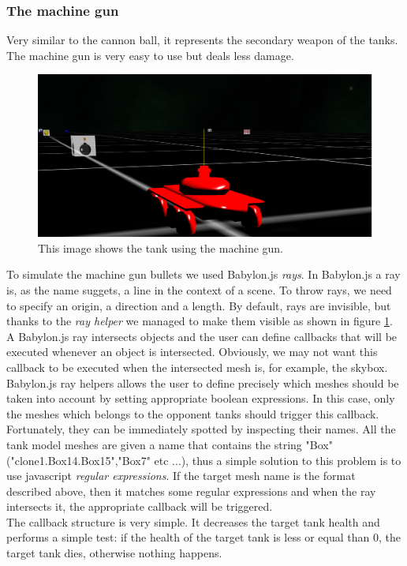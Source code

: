 \documentclass[14pt]{article}
\begin{document}
\subsubsection{The machine gun}
Very similar to the cannon ball, it represents the secondary weapon of the tanks. The machine gun is very easy to use but deals less damage. \\



\begin{figure}[H]
\includegraphics[width=12cm]{images/machineGun.png}
\caption{This image shows the tank using the machine gun.}
\label{img:machineGun}
\end{figure}

To simulate the machine gun bullets we used Babylon.js \textit{rays}. In Babylon.js a ray is, as the name suggets, a line in the context of a scene. To throw rays, we need to specify an origin, a direction and a length. By default, rays are invisible, but thanks to the \textit{ray helper} we managed to make them visible as shown in figure  \ref{img:machineGun}. A Babylon.js ray intersects objects and the user can define callbacks that will be executed whenever an object is intersected. Obviously, we may not want this callback to be executed when the intersected mesh is, for example, the skybox. Babylon.js ray helpers allows the user to define precisely which meshes should be taken into account by setting appropriate boolean expressions. In this case, only the meshes which belongs to the opponent tanks should trigger this callback. Fortunately, they can be immediately spotted by inspecting their names. All the tank model meshes are given a name that contains the string "Box" ("clone\textunderscore 1.Box14.Box15","Box7" etc ...), thus a simple solution to this problem is to use javascript \textit{regular expressions}. If the target mesh name is the format described above, then it matches some regular expressions and when the ray intersects it, the appropriate callback will be triggered. \\
The callback structure is very simple. It decreases the target tank health and performs a simple test: if the health of the target tank is less or equal than 0, the target tank dies, otherwise nothing happens.
\end{document}
